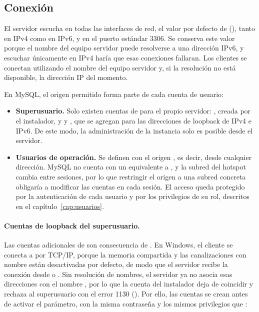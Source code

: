 \subsection{Conexi\'on}
\label{sec:conexion-mysql}

El servidor escucha en todas las interfaces de red, el valor por defecto de  (\nem{*}), tanto en IPv4 como en IPv6, y en el puerto estándar 3306. Se conserva este valor porque el nombre del equipo servidor puede resolverse a una dirección IPv6, y escuchar únicamente en IPv4 haría que esas conexiones fallaran. Los clientes se conectan utilizando el nombre del equipo servidor y, si la resolución no está disponible, la dirección IP del momento.

En MySQL, el origen permitido forma parte de cada cuenta de usuario:

\begin{itemize}[leftmargin=*]
	\item \textbf{Superusuario.} Solo existen cuentas de  para el propio servidor: , creada por el instalador, y  y , que se agregan para las direcciones de loopback de IPv4 e IPv6. De este modo, la administración de la instancia solo es posible desde el servidor.
	\item \textbf{Usuarios de operación.} Se definen con el origen , es decir, desde cualquier dirección. MySQL no cuenta con un equivalente a , y la subred del hotspot cambia entre sesiones, por lo que restringir el origen a una subred concreta obligaría a modificar las cuentas en cada sesión. El acceso queda protegido por la autenticación de cada usuario y por los privilegios de su rol, descritos en el capítulo~\ref{cap:usuarios}.
\end{itemize}

\paragraph{Cuentas de loopback del superusuario.} Las cuentas adicionales de  son consecuencia de . En Windows, el cliente  se conecta a  por TCP/IP, porque la memoria compartida y las canalizaciones con nombre están desactivadas por defecto, de modo que el servidor recibe la conexión desde  o . Sin resolución de nombres, el servidor ya no asocia esas direcciones con el nombre , por lo que la cuenta del instalador deja de coincidir y rechaza al superusuario con el error 1130 (). Por ello, las cuentas se crean antes de activar el parámetro, con la misma contraseña y los mismos privilegios que :

